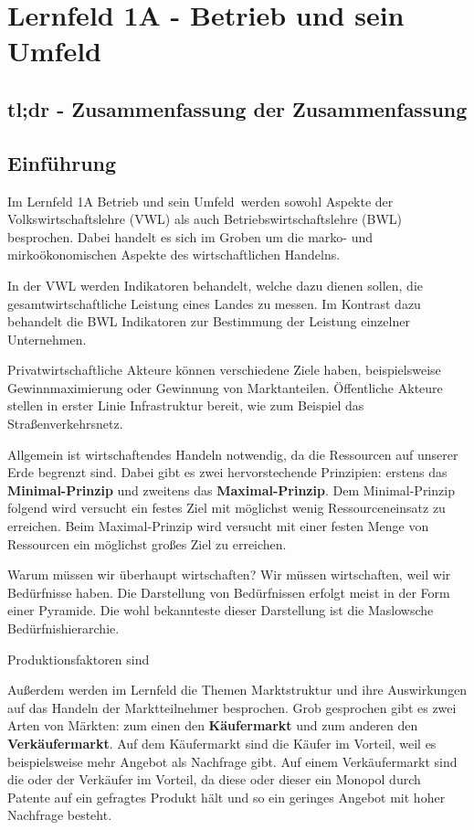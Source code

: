 \section{Lernfeld 1A - Betrieb und sein Umfeld}

\subsection{tl;dr - Zusammenfassung der Zusammenfassung}

\subsection{Einführung}
Im Lernfeld 1A \ql Betrieb und sein Umfeld\qr\ werden sowohl Aspekte der Volkswirtschaftslehre (VWL) als auch Betriebswirtschaftslehre (BWL) besprochen. Dabei handelt es sich im Groben um die marko- und mirkoökonomischen Aspekte des wirtschaftlichen Handelns.

In der VWL werden Indikatoren behandelt, welche dazu dienen sollen, die gesamtwirtschaftliche Leistung eines Landes zu messen. Im Kontrast dazu behandelt die BWL Indikatoren zur Bestimmung der Leistung einzelner Unternehmen.

Privatwirtschaftliche Akteure können verschiedene Ziele haben, beispielsweise Gewinnmaximierung oder Gewinnung von Marktanteilen. Öffentliche Akteure stellen in erster Linie Infrastruktur bereit, wie zum Beispiel das Straßenverkehrsnetz.

Allgemein ist wirtschaftendes Handeln notwendig, da die Ressourcen auf unserer Erde begrenzt sind. Dabei gibt es zwei hervorstechende Prinzipien: erstens das {\bf Minimal-Prinzip} und zweitens das {\bf Maximal-Prinzip}. Dem Minimal-Prinzip folgend wird versucht ein festes Ziel mit möglichst wenig Ressourceneinsatz zu erreichen. Beim Maximal-Prinzip wird versucht mit einer festen Menge von Ressourcen ein möglichst großes Ziel zu erreichen.

Warum müssen wir überhaupt wirtschaften? Wir müssen wirtschaften, weil wir Bedürfnisse haben. Die Darstellung von Bedürfnissen erfolgt meist in der Form einer Pyramide. Die wohl bekannteste dieser Darstellung ist die Maslowsche Bedürfnishierarchie.

Produktionsfaktoren sind


Außerdem werden im Lernfeld die Themen Marktstruktur und ihre Auswirkungen auf das Handeln der Marktteilnehmer besprochen. Grob gesprochen gibt es zwei Arten von Märkten: zum einen den {\bf Käufermarkt} und zum anderen den {\bf Verkäufermarkt}. Auf dem Käufermarkt sind die Käufer im Vorteil, weil es beispielsweise mehr Angebot als Nachfrage gibt. Auf einem Verkäufermarkt sind die oder der Verkäufer im Vorteil, da diese oder dieser ein Monopol durch Patente auf ein gefragtes Produkt hält und so ein geringes Angebot mit hoher Nachfrage besteht.

